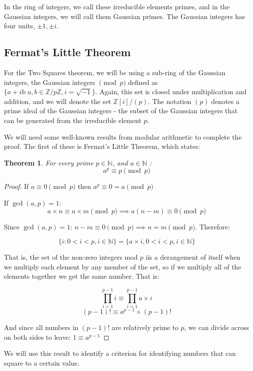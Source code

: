 \documentclass{article}
\newtheorem{theorem}{Theorem}[section]
\begin{document}
In the ring of integers, we call these irreducible elements primes, and in the Gaussian
integers, we will call them Gaussian primes. The Gaussian integers has four units,
$\pm 1, \pm i$.

\subsection{Fermat's Little Theorem}

For the Two Squares theorem, we will be using a sub-ring of the Gaussian integers, the
Gaussian integers $\pmod{p}$ defined as $\{a+ib:a,b\in \mathbb{Z}/p\mathbb{Z}, i=\sqrt{-1}\}$.
Again, this set is closed under multiplication and addition, and we will denote the set 
$\mathbb{Z}[i]/(p)$. The notation $(p)$ denotes a prime ideal of the Gaussian integers - the
subset of the Gaussian integers that can be generated from the irreducible element $p$.

We will need some well-known results from modular arithmetic to complete the proof. The first
of these is Fermat's Little Theorem, which states:

\begin{theorem}For every prime $p \in \mathbb{N}$, and $a \in \mathbb{N}$ :
\[ a^p \equiv p \pmod{p} \]
\end{theorem}

\begin{proof}
If $a\equiv 0 \pmod{p}$ then $a^p \equiv 0 = a \pmod{p}$

If $\gcd(a,p)=1$: 
\[a \times n \equiv a \times m \pmod{p} \implies a(n-m) \equiv 0 \pmod{p} \]

Since $\gcd(a,p)=1$: $n-m\equiv 0 \pmod{p} \implies n = m \pmod{p}$. Therefore:

\[ \{i: 0 < i < p, i \in \mathbb{N}\} = \{a\times i, 0 < i < p, i \in \mathbb{N} \} \]

That is, the set of the non-zero integers mod $p$ iis a derangement of itself when we 
multiply each element by any member of the set, so if we multiply all of the elements
together we get the same number. That is:

\[ \prod_{i=1}^{p-1} i \equiv \prod_{i=1}^{p-1} a\times i \]
\[ (p-1)! \equiv a^{p-1}\times (p-1)! \]

And since all numbers in $(p-1)!$ are relatively prime to $p$, we can divide across on both sides to
leave: $1 \equiv a^{p-1}$
\end{proof}

We will use this result to identify a criterion for identifying numbers that can square to a 
certain value.
\end{document}
